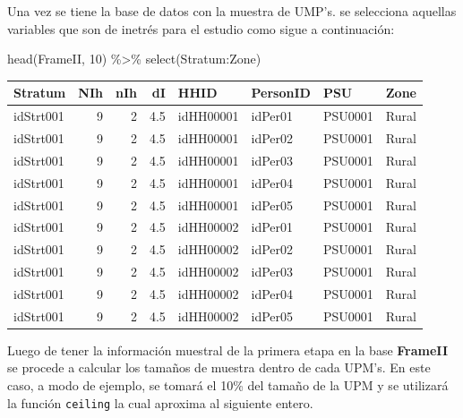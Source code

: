 \documentclass[
  12pt,
]{book}
\newenvironment{Shaded}{\begin{snugshade}}{\end{snugshade}}
\newcommand{\AttributeTok}[1]{\textcolor[rgb]{0.77,0.63,0.00}{#1}}
\newcommand{\DecValTok}[1]{\textcolor[rgb]{0.00,0.00,0.81}{#1}}
\newcommand{\FloatTok}[1]{\textcolor[rgb]{0.00,0.00,0.81}{#1}}
\newcommand{\FunctionTok}[1]{\textcolor[rgb]{0.00,0.00,0.00}{#1}}
\newcommand{\NormalTok}[1]{#1}
\newcommand{\OtherTok}[1]{\textcolor[rgb]{0.56,0.35,0.01}{#1}}
\newcommand{\SpecialCharTok}[1]{\textcolor[rgb]{0.00,0.00,0.00}{#1}}
\begin{document}
Una vez se tiene la base de datos con la muestra de UMP's. se selecciona aquellas variables que son de inetrés para el estudio como sigue a continuación:

\begin{Shaded}
\begin{Highlighting}[]
\FunctionTok{head}\NormalTok{(FrameII, }\DecValTok{10}\NormalTok{) }\SpecialCharTok{\%\textgreater{}\%} \FunctionTok{select}\NormalTok{(Stratum}\SpecialCharTok{:}\NormalTok{Zone)}
\end{Highlighting}
\end{Shaded}

\begin{tabular}{l|r|r|r|l|l|l|l}
\hline
Stratum & NIh & nIh & dI & HHID & PersonID & PSU & Zone\\
\hline
idStrt001 & 9 & 2 & 4.5 & idHH00001 & idPer01 & PSU0001 & Rural\\
\hline
idStrt001 & 9 & 2 & 4.5 & idHH00001 & idPer02 & PSU0001 & Rural\\
\hline
idStrt001 & 9 & 2 & 4.5 & idHH00001 & idPer03 & PSU0001 & Rural\\
\hline
idStrt001 & 9 & 2 & 4.5 & idHH00001 & idPer04 & PSU0001 & Rural\\
\hline
idStrt001 & 9 & 2 & 4.5 & idHH00001 & idPer05 & PSU0001 & Rural\\
\hline
idStrt001 & 9 & 2 & 4.5 & idHH00002 & idPer01 & PSU0001 & Rural\\
\hline
idStrt001 & 9 & 2 & 4.5 & idHH00002 & idPer02 & PSU0001 & Rural\\
\hline
idStrt001 & 9 & 2 & 4.5 & idHH00002 & idPer03 & PSU0001 & Rural\\
\hline
idStrt001 & 9 & 2 & 4.5 & idHH00002 & idPer04 & PSU0001 & Rural\\
\hline
idStrt001 & 9 & 2 & 4.5 & idHH00002 & idPer05 & PSU0001 & Rural\\
\hline
\end{tabular}

Luego de tener la información muestral de la primera etapa en la base \textbf{FrameII} se procede a calcular los tamaños de muestra dentro de cada UPM's. En este caso, a modo de ejemplo, se tomará el 10\% del tamaño de la UPM y se utilizará la función \texttt{ceiling} la cual aproxima al siguiente entero.

\begin{Shaded}
\end{Shaded}
\end{document}
